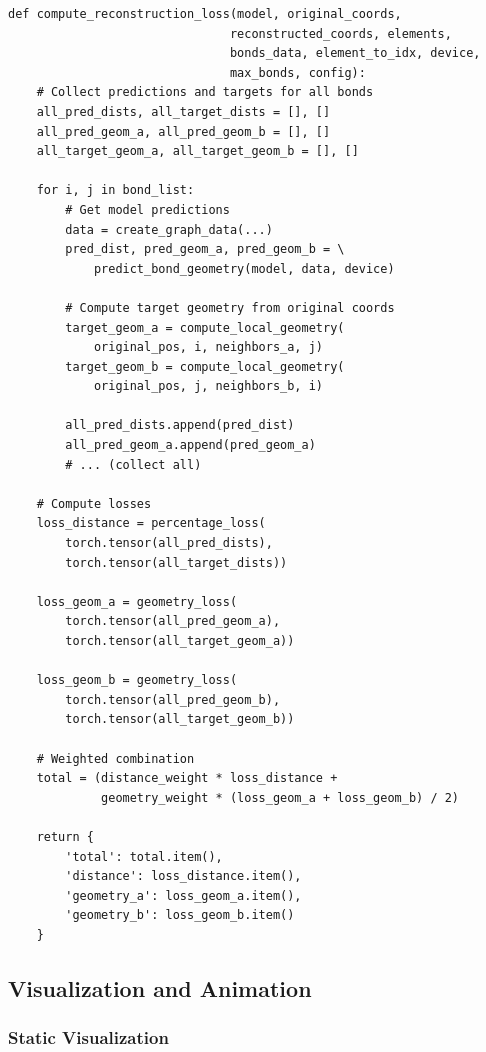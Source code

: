 \documentclass[11pt,a4paper]{article}
\begin{document}
\begin{lstlisting}[caption={Reconstruction Loss (lines 1634-1853)}]
def compute_reconstruction_loss(model, original_coords,
                               reconstructed_coords, elements,
                               bonds_data, element_to_idx, device,
                               max_bonds, config):
    # Collect predictions and targets for all bonds
    all_pred_dists, all_target_dists = [], []
    all_pred_geom_a, all_pred_geom_b = [], []
    all_target_geom_a, all_target_geom_b = [], []

    for i, j in bond_list:
        # Get model predictions
        data = create_graph_data(...)
        pred_dist, pred_geom_a, pred_geom_b = \
            predict_bond_geometry(model, data, device)

        # Compute target geometry from original coords
        target_geom_a = compute_local_geometry(
            original_pos, i, neighbors_a, j)
        target_geom_b = compute_local_geometry(
            original_pos, j, neighbors_b, i)

        all_pred_dists.append(pred_dist)
        all_pred_geom_a.append(pred_geom_a)
        # ... (collect all)

    # Compute losses
    loss_distance = percentage_loss(
        torch.tensor(all_pred_dists),
        torch.tensor(all_target_dists))

    loss_geom_a = geometry_loss(
        torch.tensor(all_pred_geom_a),
        torch.tensor(all_target_geom_a))

    loss_geom_b = geometry_loss(
        torch.tensor(all_pred_geom_b),
        torch.tensor(all_target_geom_b))

    # Weighted combination
    total = (distance_weight * loss_distance +
             geometry_weight * (loss_geom_a + loss_geom_b) / 2)

    return {
        'total': total.item(),
        'distance': loss_distance.item(),
        'geometry_a': loss_geom_a.item(),
        'geometry_b': loss_geom_b.item()
    }
\end{lstlisting}

\subsection{Visualization and Animation}

\subsubsection{Static Visualization}
\end{document}
